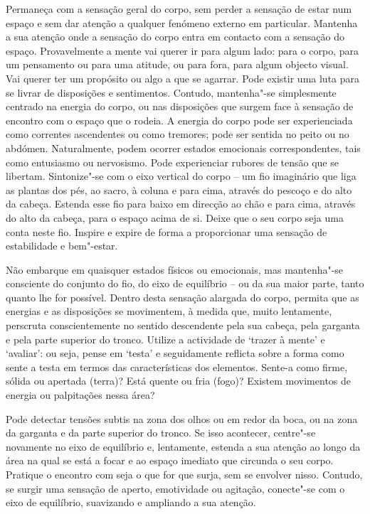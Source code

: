 Permaneça com a sensação geral do corpo, sem perder a sensação de estar num espaço e sem dar atenção a qualquer fenómeno externo em particular. Mantenha a sua atenção onde a sensação do corpo entra em contacto com a sensação do espaço. Provavelmente a mente vai querer ir para algum lado: para o corpo, para um pensamento ou para uma atitude, ou para fora, para algum objecto visual. Vai querer ter um propósito ou algo a que se agarrar. Pode existir uma luta para se livrar de disposições e sentimentos. Contudo, mantenha"-se simplesmente centrado na energia do corpo, ou nas disposições que surgem face à sensação de encontro com o espaço que o rodeia. A energia do corpo pode ser experienciada como correntes ascendentes ou como tremores; pode ser sentida no peito ou no abdómen. Naturalmente, podem ocorrer estados emocionais correspondentes, tais como entusiasmo ou nervosismo. Pode experienciar rubores de tensão que se libertam. Sintonize"-se com o eixo vertical do corpo -- um fio imaginário que liga as plantas dos pés, ao sacro, à coluna e para cima, através do pescoço e do alto da cabeça. Estenda esse fio para baixo em direcção ao chão e para cima, através do alto da cabeça, para o espaço acima de si. Deixe que o seu corpo seja uma conta neste fio. Inspire e expire de forma a proporcionar uma sensação de estabilidade e bem"-estar.

Não embarque em quaisquer estados físicos ou emocionais, mas mantenha"-se consciente do conjunto do fio, do eixo de equilíbrio -- ou da sua maior parte, tanto quanto lhe for possível. Dentro desta sensação alargada do corpo, permita que as energias e as disposições se movimentem, à medida que, muito lentamente, perscruta conscientemente no sentido descendente pela sua cabeça, pela garganta e pela parte superior do tronco. Utilize a actividade de `trazer à mente' e `avaliar': ou seja, pense em `testa' e seguidamente reflicta sobre a forma como sente a testa em termos das características dos elementos. Sente-a como firme, sólida ou apertada (terra)? Está quente ou fria (fogo)? Existem movimentos de energia ou palpitações nessa área?

Pode detectar tensões subtis na zona dos olhos ou em redor da boca, ou na zona da garganta e da parte superior do tronco. Se isso acontecer, centre"-se novamente no eixo de equilíbrio e, lentamente, estenda a sua atenção ao longo da área na qual se está a focar e ao espaço imediato que circunda o seu corpo. Pratique o encontro com seja o que for que surja, sem se envolver nisso. Contudo, se surgir uma sensação de aperto, emotividade ou agitação, conecte"-se com o eixo de equilíbrio, suavizando e ampliando a sua atenção.

